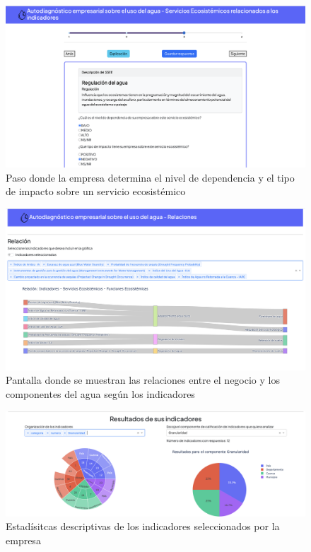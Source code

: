 \begin{figure}[H]
        \centering
        \includegraphics[scale=0.25]{images/99-aplicacion-web/6-ssee.png}
        \caption{Paso donde la empresa determina el nivel de dependencia y el tipo de impacto sobre un servicio ecosistémico}
\end{figure}

\begin{figure}[H]
        \centering
        \includegraphics[scale=0.25]{images/99-aplicacion-web/7-relaciones.png}
        \caption{Pantalla donde se muestran las relaciones entre el negocio y los componentes del agua según los indicadores}
\end{figure}

\begin{figure}[H]
        \centering
        \includegraphics[scale=0.25]{images/99-aplicacion-web/10-respuestas-indicadores.png}
        \caption{Estadísitcas descriptivas de los indicadores seleccionados por la empresa}
\end{figure}